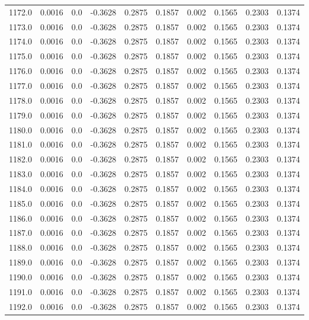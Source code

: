 \begin{longtable}{lrrrrrrrrr}
1172.0 & 0.0016 & 0.0 & -0.3628 & 0.2875 & 0.1857 & 0.002 & 0.1565 & 0.2303 & 0.1374 \\
1173.0 & 0.0016 & 0.0 & -0.3628 & 0.2875 & 0.1857 & 0.002 & 0.1565 & 0.2303 & 0.1374 \\
1174.0 & 0.0016 & 0.0 & -0.3628 & 0.2875 & 0.1857 & 0.002 & 0.1565 & 0.2303 & 0.1374 \\
1175.0 & 0.0016 & 0.0 & -0.3628 & 0.2875 & 0.1857 & 0.002 & 0.1565 & 0.2303 & 0.1374 \\
1176.0 & 0.0016 & 0.0 & -0.3628 & 0.2875 & 0.1857 & 0.002 & 0.1565 & 0.2303 & 0.1374 \\
1177.0 & 0.0016 & 0.0 & -0.3628 & 0.2875 & 0.1857 & 0.002 & 0.1565 & 0.2303 & 0.1374 \\
1178.0 & 0.0016 & 0.0 & -0.3628 & 0.2875 & 0.1857 & 0.002 & 0.1565 & 0.2303 & 0.1374 \\
1179.0 & 0.0016 & 0.0 & -0.3628 & 0.2875 & 0.1857 & 0.002 & 0.1565 & 0.2303 & 0.1374 \\
1180.0 & 0.0016 & 0.0 & -0.3628 & 0.2875 & 0.1857 & 0.002 & 0.1565 & 0.2303 & 0.1374 \\
1181.0 & 0.0016 & 0.0 & -0.3628 & 0.2875 & 0.1857 & 0.002 & 0.1565 & 0.2303 & 0.1374 \\
1182.0 & 0.0016 & 0.0 & -0.3628 & 0.2875 & 0.1857 & 0.002 & 0.1565 & 0.2303 & 0.1374 \\
1183.0 & 0.0016 & 0.0 & -0.3628 & 0.2875 & 0.1857 & 0.002 & 0.1565 & 0.2303 & 0.1374 \\
1184.0 & 0.0016 & 0.0 & -0.3628 & 0.2875 & 0.1857 & 0.002 & 0.1565 & 0.2303 & 0.1374 \\
1185.0 & 0.0016 & 0.0 & -0.3628 & 0.2875 & 0.1857 & 0.002 & 0.1565 & 0.2303 & 0.1374 \\
1186.0 & 0.0016 & 0.0 & -0.3628 & 0.2875 & 0.1857 & 0.002 & 0.1565 & 0.2303 & 0.1374 \\
1187.0 & 0.0016 & 0.0 & -0.3628 & 0.2875 & 0.1857 & 0.002 & 0.1565 & 0.2303 & 0.1374 \\
1188.0 & 0.0016 & 0.0 & -0.3628 & 0.2875 & 0.1857 & 0.002 & 0.1565 & 0.2303 & 0.1374 \\
1189.0 & 0.0016 & 0.0 & -0.3628 & 0.2875 & 0.1857 & 0.002 & 0.1565 & 0.2303 & 0.1374 \\
1190.0 & 0.0016 & 0.0 & -0.3628 & 0.2875 & 0.1857 & 0.002 & 0.1565 & 0.2303 & 0.1374 \\
1191.0 & 0.0016 & 0.0 & -0.3628 & 0.2875 & 0.1857 & 0.002 & 0.1565 & 0.2303 & 0.1374 \\
1192.0 & 0.0016 & 0.0 & -0.3628 & 0.2875 & 0.1857 & 0.002 & 0.1565 & 0.2303 & 0.1374 \\

\end{longtable}
